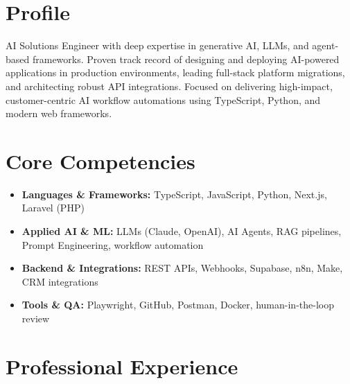 \documentclass[11pt,a4paper,sans]{moderncv}
\begin{document}
\makecvtitle

\section{Profile}
AI Solutions Engineer with deep expertise in generative AI, LLMs, and agent-based frameworks. Proven track record of designing and deploying AI-powered applications in production environments, leading full-stack platform migrations, and architecting robust API integrations. Focused on delivering high-impact, customer-centric AI workflow automations using TypeScript, Python, and modern web frameworks.

\section{Core Competencies}
\begin{itemize}
\item \textbf{Languages \& Frameworks:} TypeScript, JavaScript, Python, Next.js, Laravel (PHP)
\item \textbf{Applied AI \& ML:} LLMs (Claude, OpenAI), AI Agents, RAG pipelines, Prompt Engineering, workflow automation
\item \textbf{Backend \& Integrations:} REST APIs, Webhooks, Supabase, n8n, Make, CRM integrations
\item \textbf{Tools \& QA:} Playwright, GitHub, Postman, Docker, human-in-the-loop review
\end{itemize}

\section{Professional Experience}

\end{document}

